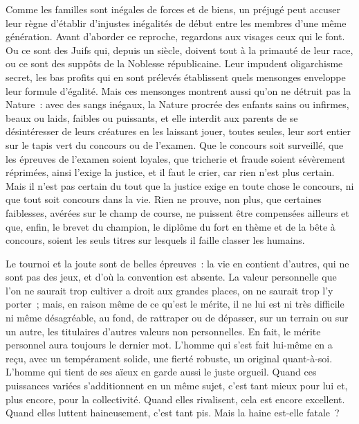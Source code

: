 \documentclass[french,twoside]{book} %
\begin{document}
Comme les familles sont inégales de forces et de biens, un préjugé peut accuser leur règne d’établir d’injustes inégalités de début entre les membres d’une même génération. Avant d’aborder ce reproche, regardons aux visages ceux qui le font. Ou ce sont des Juifs qui, depuis un siècle, doivent tout à la primauté de leur race, ou ce sont des suppôts de la Noblesse républicaine. Leur impudent oligarchisme secret, les bas profits qui en sont prélevés établissent quels mensonges enveloppe leur formule d’égalité. Mais ces mensonges montrent aussi qu’on ne détruit pas la Nature : avec des sangs inégaux, la Nature procrée des enfants sains ou infirmes, beaux ou laids, faibles ou puissants, et elle interdit aux parents de se désintéresser de leurs créatures en les laissant jouer, toutes seules, leur sort entier sur le tapis vert du concours ou de l’examen. Que le concours soit surveillé, que les épreuves de l’examen soient loyales, que tricherie et fraude soient sévèrement réprimées, ainsi l’exige la justice, et il faut le crier, car rien n’est plus certain. Mais il n’est pas certain du tout que la justice exige en toute chose le concours, ni que tout soit concours dans la vie. Rien ne prouve, non plus, que certaines faiblesses, avérées sur le champ de course, ne puissent être compensées ailleurs et que, enfin, le brevet du champion, le diplôme du fort en thème et de la bête à concours, soient les seuls titres sur lesquels il faille classer les humains.\par
Le tournoi et la joute sont de belles épreuves : la vie en contient d’autres, qui ne sont pas des jeux, et d’où la convention est absente. La valeur personnelle que l’on ne saurait trop cultiver a droit aux grandes places, on ne saurait trop l’y porter ; mais, en raison même de ce qu’est le mérite, il ne lui est ni très difficile ni même désagréable, au fond, de rattraper ou de dépasser, sur un terrain ou sur un autre, les titulaires d’autres valeurs non personnelles. En fait, le mérite personnel aura toujours le dernier mot. L’homme qui s’est fait lui-même en a reçu, avec un tempérament solide, une fierté robuste, un original quant-à-soi. L’homme qui tient de ses aïeux en garde aussi le juste orgueil. Quand ces puissances variées s’additionnent en un même sujet, c’est tant mieux pour lui et, plus encore, pour la collectivité. Quand elles rivalisent, cela est encore excellent. Quand elles luttent haineusement, c’est tant pis. Mais la haine est-elle fatale ?\par
\end{document}
